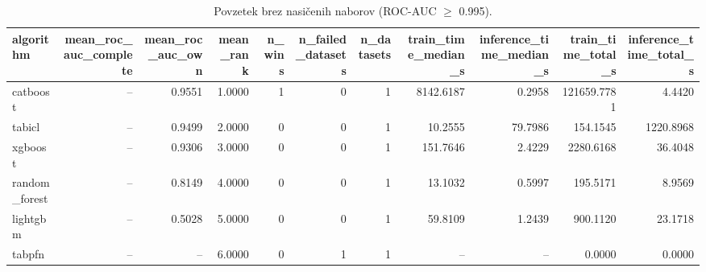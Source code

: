\begin{table}[htbp]
\centering
\caption{Povzetek brez nasičenih naborov (ROC-AUC $\geq$ 0.995).}
\label{tab:overall-nonsat}
\begin{tabular}{lrrrrrrrrrr}
\hline
algorithm & mean\_roc\_auc\_complete & mean\_roc\_auc\_own & mean\_rank & n\_wins & n\_failed\_datasets & n\_datasets & train\_time\_median\_s & inference\_time\_median\_s & train\_time\_total\_s & inference\_time\_total\_s \\
\hline
catboost & -- & 0.9551 & 1.0000 & 1 & 0 & 1 & 8142.6187 & 0.2958 & 121659.7781 & 4.4420 \\
tabicl & -- & 0.9499 & 2.0000 & 0 & 0 & 1 & 10.2555 & 79.7986 & 154.1545 & 1220.8968 \\
xgboost & -- & 0.9306 & 3.0000 & 0 & 0 & 1 & 151.7646 & 2.4229 & 2280.6168 & 36.4048 \\
random\_forest & -- & 0.8149 & 4.0000 & 0 & 0 & 1 & 13.1032 & 0.5997 & 195.5171 & 8.9569 \\
lightgbm & -- & 0.5028 & 5.0000 & 0 & 0 & 1 & 59.8109 & 1.2439 & 900.1120 & 23.1718 \\
tabpfn & -- & -- & 6.0000 & 0 & 1 & 1 & -- & -- & 0.0000 & 0.0000 \\
\hline
\end{tabular}
\end{table}
